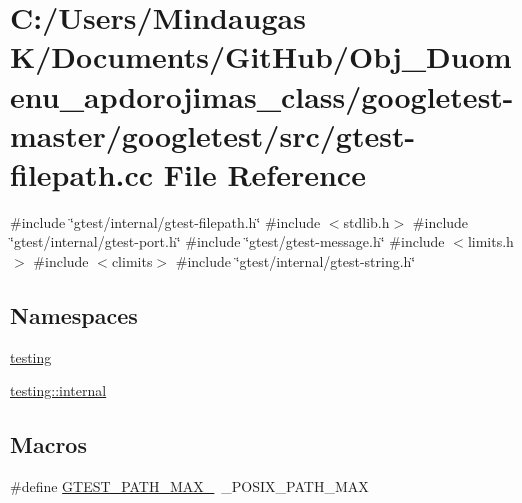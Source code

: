 \hypertarget{googletest-master_2googletest_2src_2gtest-filepath_8cc}{}\section{C\+:/\+Users/\+Mindaugas K/\+Documents/\+Git\+Hub/\+Obj\+\_\+\+Duomenu\+\_\+apdorojimas\+\_\+class/googletest-\/master/googletest/src/gtest-\/filepath.cc File Reference}
\label{googletest-master_2googletest_2src_2gtest-filepath_8cc}
{\ttfamily \#include \char`\"{}gtest/internal/gtest-\/filepath.\+h\char`\"{}}\newline
{\ttfamily \#include $<$stdlib.\+h$>$}\newline
{\ttfamily \#include \char`\"{}gtest/internal/gtest-\/port.\+h\char`\"{}}\newline
{\ttfamily \#include \char`\"{}gtest/gtest-\/message.\+h\char`\"{}}\newline
{\ttfamily \#include $<$limits.\+h$>$}\newline
{\ttfamily \#include $<$climits$>$}\newline
{\ttfamily \#include \char`\"{}gtest/internal/gtest-\/string.\+h\char`\"{}}\newline
\subsection*{Namespaces}
\begin{DoxyCompactItemize}
\item 
 \mbox{\hyperlink{namespacetesting}{testing}}
\item 
 \mbox{\hyperlink{namespacetesting_1_1internal}{testing\+::internal}}
\end{DoxyCompactItemize}
\subsection*{Macros}
\begin{DoxyCompactItemize}
\item 
\#define \mbox{\hyperlink{googletest-master_2googletest_2src_2gtest-filepath_8cc_ad9d445747785a9271a57cf1d392b89ad}{G\+T\+E\+S\+T\+\_\+\+P\+A\+T\+H\+\_\+\+M\+A\+X\+\_\+}}~\+\_\+\+P\+O\+S\+I\+X\+\_\+\+P\+A\+T\+H\+\_\+\+M\+AX
\end{DoxyCompactItemize}
